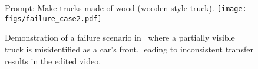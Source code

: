 \begin{figure}
    \centering
    Prompt: Make trucks made of wood (wooden style truck).
    \texttt{[image: figs/failure\_case2.pdf]}
    \caption{Demonstration of a failure scenario in \ours\ where a partially visible truck is misidentified as a car's front, leading to inconsistent transfer results in the edited video.}
    \label{fig.failure2}
\end{figure}
